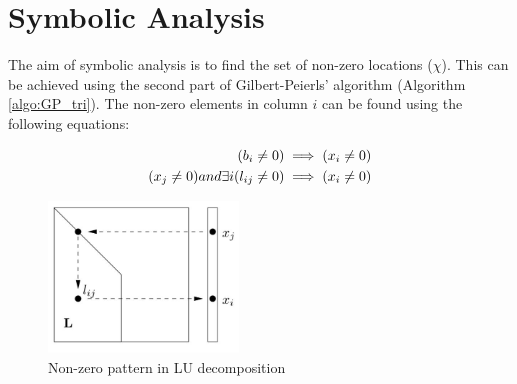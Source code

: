 \section{Symbolic Analysis}
The aim of symbolic analysis is to find the set of non-zero locations (\(\chi\)). 
This can be achieved using the second part of Gilbert-Peierls' algorithm (Algorithm \ref{algo:GP_tri}).
The non-zero elements in column $i$ can be found using the following equations:

\begin{subequations}
    \centering
    \begin{align}
        (b_i \neq 0) &\implies (x_i \neq 0) \\
        (x_j \neq 0) and \exists i(l_{ij} \neq 0) &\implies (x_i \neq 0)
    \end{align}
    \label{eqn:sym:findingX}
\end{subequations}

\begin{figure}[h]
    \centering
    \includegraphics[width = 0.45\textwidth]{./Theory/nnzPattern.JPG}
    \caption{Non-zero pattern in LU decomposition}
    \label{fig:sym:nnzPattern}
\end{figure}

